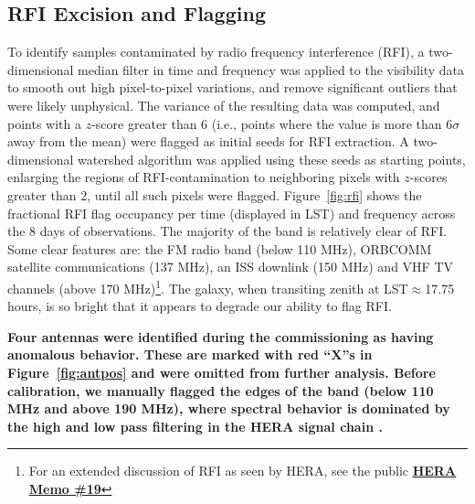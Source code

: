 \documentclass[twocolumn, trackchanges]{aastex61}
\newcommand{\edited}[1]{{\bf \color{blue} #1}}
\begin{document}
\edited{\subsection{RFI Excision and Flagging}}

To identify samples contaminated by radio frequency interference (RFI), a two-dimensional median filter in time and frequency was applied to the visibility data to smooth out high pixel-to-pixel variations, and remove significant outliers that were likely unphysical. The variance of the resulting data was computed, and points with a $z$-score greater than 6 (i.e., points where the value is more than 6$\sigma$ away from the mean) were flagged as initial seeds for RFI extraction. A two-dimensional watershed algorithm was applied using these seeds as starting points, enlarging the regions of RFI-contamination to neighboring pixels with $z$-scores greater than 2, until all such pixels were flagged. Figure~\ref{fig:rfi} shows the fractional RFI flag occupancy per time (displayed in LST) and frequency across the 8 days of observations. The majority of the band is relatively clear of RFI. Some clear features are: the FM radio band (below 110 MHz), ORBCOMM satellite communications (137 MHz), an ISS downlink (150 MHz) and VHF TV channels (above 170 MHz)\footnote{For an extended discussion of RFI as seen by HERA, see the public \href{http://reionization.org/wp-content/uploads/2013/03/HERAMemo19_HERA_dish_RFI.pdf}{\edited{\underline{HERA Memo \#19}}}}.
The galaxy, when transiting zenith at LST$\approx$17.75 hours, is so bright that it appears to degrade our ability to flag RFI.  

\edited{Four antennas were identified during the commissioning as having anomalous behavior. These are marked with red ``X''s in Figure~\ref{fig:antpos} and were omitted from further analysis.  Before calibration, we manually flagged the edges of the band (below 110 MHz and above 190 MHz), where spectral behavior is dominated by the high and low pass filtering in the HERA signal chain \citep{deBoer17}.}
\end{document}
